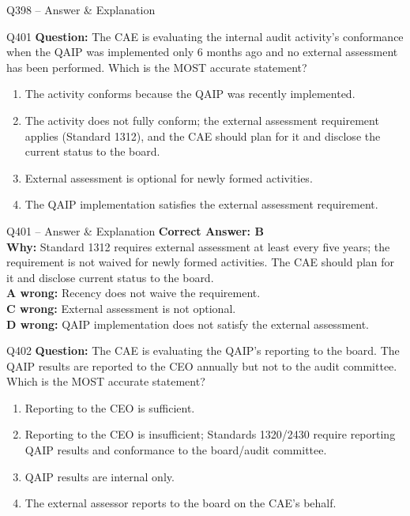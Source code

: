 \documentclass[aspectratio=169,10pt]{beamer}
\begin{document}
\begin{frame}[t]{Q398 -- Answer \& Explanation}
	\begin{frame}[t]{Q401}
		\small
		\textbf{Question:} The CAE is evaluating the internal audit activity's conformance when the QAIP was implemented only 6 months ago and no external assessment has been performed. Which is the MOST accurate statement?
		\begin{enumerate}[label=\Alph*.,itemsep=1pt,topsep=2pt]
			\item The activity conforms because the QAIP was recently implemented.
			\item The activity does not fully conform; the external assessment requirement applies (Standard 1312), and the CAE should plan for it and disclose the current status to the board.
			\item External assessment is optional for newly formed activities.
			\item The QAIP implementation satisfies the external assessment requirement.
		\end{enumerate}
	\end{frame}
	
	\begin{frame}[t]{Q401 -- Answer \& Explanation}
		\small
		\textbf{Correct Answer: B} \\[4pt]
		\textbf{Why:} Standard 1312 requires external assessment at least every five years; the requirement is not waived for newly formed activities. The CAE should plan for it and disclose current status to the board. \\[4pt]
		\textbf{A wrong:} Recency does not waive the requirement. \\[2pt]
		\textbf{C wrong:} External assessment is not optional. \\[2pt]
		\textbf{D wrong:} QAIP implementation does not satisfy the external assessment.
	\end{frame}
	
	\begin{frame}[t]{Q402}
		\small
		\textbf{Question:} The CAE is evaluating the QAIP's reporting to the board. The QAIP results are reported to the CEO annually but not to the audit committee. Which is the MOST accurate statement?
		\begin{enumerate}[label=\Alph*.,itemsep=1pt,topsep=2pt]
			\item Reporting to the CEO is sufficient.
			\item Reporting to the CEO is insufficient; Standards 1320/2430 require reporting QAIP results and conformance to the board/audit committee.
			\item QAIP results are internal only.
			\item The external assessor reports to the board on the CAE's behalf.
		\end{enumerate}
	\end{frame}
	

\end{frame}
\end{document}

